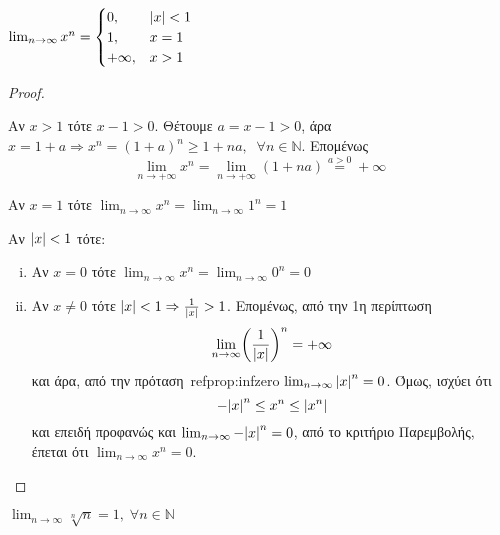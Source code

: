 \begin{mybox3}
  \begin{prop}
    $ \lim_{n \to \infty} x^{n} = 
    \begin{cases} 
      0, & \abs{x} < 1 \\
      1, & x=1 \\
      +\infty, & x > 1
    \end{cases} $ 
  \end{prop}
\end{mybox3}
\begin{proof}
\item {}
  \begin{myitemize}
    \item Αν $ x>1 $ τότε $ x-1>0 $. Θέτουμε $ a = x-1>0 $, άρα $ x = 1+a 
      \Rightarrow x^{n} = (1+a)^{n} \geq 1+na, \; \; \forall n \in \mathbb{N} $.
      Επομένως 
      \[
        \lim_{n \to +\infty} x^{n} = \lim_{n \to +\infty} (1+na) 
        \overset{a>0}{=} +\infty 
      \]
    \item Αν $ x=1 $ τότε $ \lim_{n \to \infty} x^{n} = \lim_{n \to \infty} 1^{n} = 1 $
    \item Αν $ \abs{x} < 1 $ τότε: 
      \begin{enumerate}[i)]
        \item Αν $ x=0 $ τότε $ \lim_{n \to \infty} x^{n} = 
          \lim_{n \to \infty} 0^{n} = 0 $
        \item Αν $ x \neq 0 $ τότε $ \abs{x} < 1 \Rightarrow \frac{1}{\abs{x}} > 1$. 
          Επομένως, από την 1η περίπτωση
          \[
            \lim_{n \to \infty} \biggl(\frac{1}{\abs{x}}\biggr)^{n} = + \infty
          \] 
          και άρα, από την πρόταση~ref{prop:infzero} 
          $ \lim_{n \to \infty} \abs{x} ^{n} = 0 $. Όμως, ισχύει ότι
          \[
            - \abs{x} ^{n} \leq x^{n} \leq \abs{x^{n}}
          \]
          και επειδή προφανώς και $ \lim_{n \to \infty} - \abs{x} ^{n} = 0 $, από 
          το κριτήριο Παρεμβολής, έπεται ότι $ \lim_{n \to \infty} x^{n} = 0 $.
      \end{enumerate}
  \end{myitemize}
\end{proof}


\begin{mybox3}
  \begin{prop}
    $ \lim_{n \to \infty} \sqrt[n]{n} = 1, \; \forall n \in \mathbb{N}  $
  \end{prop}
\end{mybox3}

